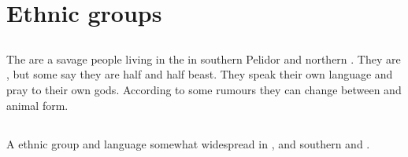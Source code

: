 








































\chapter{Ethnic groups}















\section{\Goydens}
The \Goydens{} are a savage people living in the \Wylde{} in southern Pelidor and northern . 
They are \humans, but some say they are half \human{} and half beast. 
They speak their own language and pray to their own gods. 
According to some rumours they can change between \human{} and animal form. 















\section{\Orticans}
\index{\Ortican}
A \scathaese{} ethnic group and language somewhat widespread in ,  and southern  and . 

